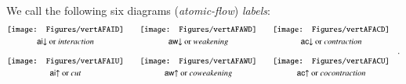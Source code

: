 \begin{definition}\label{definition:FlowLabels}
We call the following six diagrams (\emph{atomic-flow}) \emph{labels}:
\[
\begin{array}{@{}c@{}c@{}c@{}}
\vcenter{\hbox{\texttt{[image: Figures/vertAFAID]}}}&
\qquad
\vcenter{\hbox{\texttt{[image: Figures/vertAFAWD]}}}&
\qquad
\vcenter{\hbox{\texttt{[image: Figures/vertAFACD]}}}\\
\noalign{\smallskip}
      \mbox{$\aid$ or \emph{interaction}}&
\qquad\mbox{$\awd$ or \emph{weakening}}&
\qquad\mbox{$\acd$ or \emph{contraction}}\\
\noalign{\bigskip}
\vcenter{\hbox{\texttt{[image: Figures/vertAFAIU]}}}&
\qquad
\vcenter{\hbox{\texttt{[image: Figures/vertAFAWU]}}}&
\qquad
\vcenter{\hbox{\texttt{[image: Figures/vertAFACU]}}}\\
\noalign{\smallskip}
      \mbox{$\aiu$ or \emph{cut}}&
\qquad\mbox{$\awu$ or \emph{coweakening}}&
\qquad\mbox{$\acu$ or \emph{cocontraction}}\\
\end{array}\quad.
\]
\end{definition}


